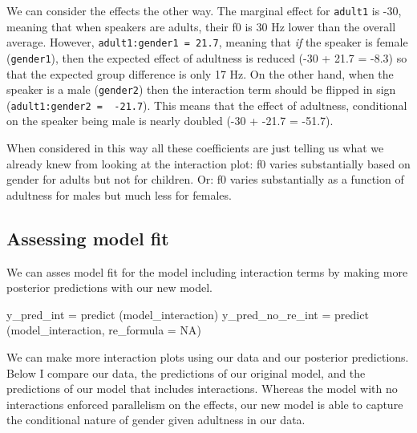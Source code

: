 \documentclass[
]{book}
\newenvironment{Shaded}{\begin{snugshade}}{\end{snugshade}}
\newcommand{\AttributeTok}[1]{\textcolor[rgb]{0.77,0.63,0.00}{#1}}
\newcommand{\ConstantTok}[1]{\textcolor[rgb]{0.00,0.00,0.00}{#1}}
\newcommand{\FunctionTok}[1]{\textcolor[rgb]{0.00,0.00,0.00}{#1}}
\newcommand{\NormalTok}[1]{#1}
\newcommand{\OtherTok}[1]{\textcolor[rgb]{0.56,0.35,0.01}{#1}}
\begin{document}
We can consider the effects the other way. The marginal effect for \texttt{adult1} is -30, meaning that when speakers are adults, their f0 is 30 Hz lower than the overall average. However, \texttt{adult1:gender1\ =\ 21.7}, meaning that \emph{if} the speaker is female (\texttt{gender1}), then the expected effect of adultness is reduced (-30 + 21.7 = -8.3) so that the expected group difference is only 17 Hz. On the other hand, when the speaker is a male (\texttt{gender2}) then the interaction term should be flipped in sign (\texttt{adult1:gender2\ =\ \ -21.7}). This means that the effect of adultness, conditional on the speaker being male is nearly doubled (-30 + -21.7 = -51.7).

When considered in this way all these coefficients are just telling us what we already knew from looking at the interaction plot: f0 varies substantially based on gender for adults but not for children. Or: f0 varies substantially as a function of adultness for males but much less for females.

\hypertarget{assessing-model-fit}{%
\subsection{Assessing model fit}\label{assessing-model-fit}}

We can asses model fit for the model including interaction terms by making more posterior predictions with our new model.

\begin{Shaded}
\begin{Highlighting}[]
\NormalTok{y\_pred\_int }\OtherTok{=} \FunctionTok{predict}\NormalTok{ (model\_interaction)}
\NormalTok{y\_pred\_no\_re\_int }\OtherTok{=} \FunctionTok{predict}\NormalTok{ (model\_interaction, }\AttributeTok{re\_formula =} \ConstantTok{NA}\NormalTok{)}
\end{Highlighting}
\end{Shaded}

We can make more interaction plots using our data and our posterior predictions. Below I compare our data, the predictions of our original model, and the predictions of our model that includes interactions. Whereas the model with no interactions enforced parallelism on the effects, our new model is able to capture the conditional nature of gender given adultness in our data.
\end{document}
